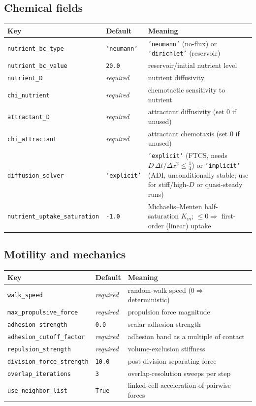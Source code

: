 \documentclass[11pt]{article}
\newcommand{\code}[1]{\texttt{#1}}
\begin{document}
\subsection{Chemical fields}
\begin{longtable}{p{} p{} p{}}
\toprule
Key & Default & Meaning \\ \midrule \endhead
\code{nutrient\_bc\_type} & \code{'neumann'} & \code{'neumann'} (no-flux) or \code{'dirichlet'} (reservoir) \\
\code{nutrient\_bc\_value} & \code{20.0} & reservoir/initial nutrient level \\
\code{nutrient\_D} & \emph{required} & nutrient diffusivity \\
\code{chi\_nutrient} & \emph{required} & chemotactic sensitivity to nutrient \\
\code{attractant\_D} & \emph{required} & attractant diffusivity (set 0 if unused) \\
\code{chi\_attractant} & \emph{required} & attractant chemotaxis (set 0 if unused) \\
\code{diffusion\_solver} & \code{'explicit'} & \code{'explicit'} (FTCS, needs $D\,\Delta t/\Delta x^2\le\tfrac14$) or \code{'implicit'} (ADI, unconditionally stable; use for stiff/high-$D$ or quasi-steady runs) \\
\code{nutrient\_uptake\_saturation} & \code{-1.0} & Michaelis--Menten half-saturation $K_m$; $\le 0 \Rightarrow$ first-order (linear) uptake \\
\bottomrule
\end{longtable}

\subsection{Motility and mechanics}
\begin{longtable}{p{} p{} p{}}
\toprule
Key & Default & Meaning \\ \midrule \endhead
\code{walk\_speed} & \emph{required} & random-walk speed ($0 \Rightarrow$ deterministic) \\
\code{max\_propulsive\_force} & \emph{required} & propulsion force magnitude \\
\code{adhesion\_strength} & \code{0.0} & scalar adhesion strength \\
\code{adhesion\_cutoff\_factor} & \emph{required} & adhesion band as a multiple of contact \\
\code{repulsion\_strength} & \emph{required} & volume-exclusion stiffness \\
\code{division\_force\_strength} & \code{10.0} & post-division separating force \\
\code{overlap\_iterations} & \code{3} & overlap-resolution sweeps per step \\
\code{use\_neighbor\_list} & \code{True} & linked-cell acceleration of pairwise forces \\
\bottomrule
\end{longtable}
\end{document}
